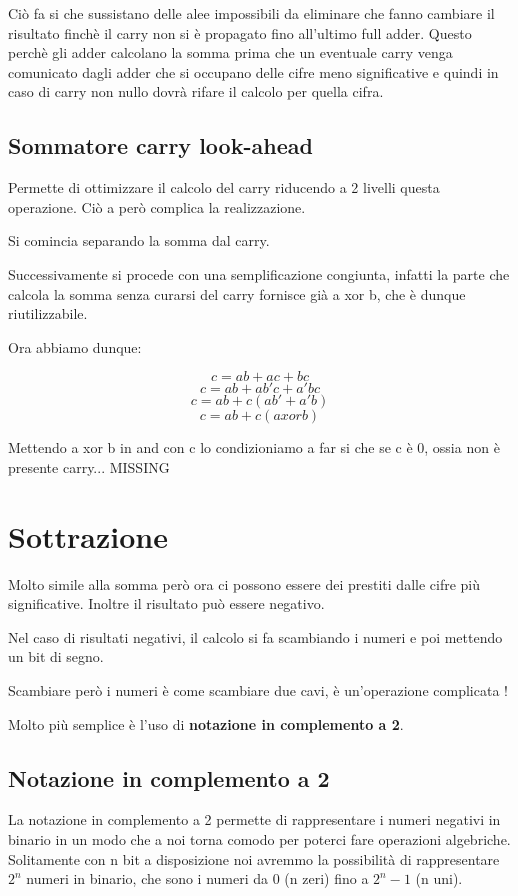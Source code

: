 \documentclass[a4paper]{book}
\begin{document}
Ciò fa si che sussistano delle alee impossibili da eliminare che fanno cambiare il risultato finchè il carry non si è propagato fino all'ultimo full adder.
Questo perchè gli adder calcolano la somma prima che un eventuale carry venga comunicato dagli adder che si occupano delle cifre meno significative e quindi in caso di carry non nullo dovrà rifare il calcolo per quella cifra.


\subsection{Sommatore carry look-ahead}

Permette di ottimizzare il calcolo del carry riducendo a 2 livelli questa operazione. Ciò a però complica la realizzazione.

Si comincia separando la somma dal carry.

Successivamente si procede con una semplificazione congiunta, infatti la parte che calcola la somma senza curarsi del carry fornisce già a xor b, che è dunque riutilizzabile.

Ora abbiamo dunque:

\[c=ab+ac+bc\]
\[c=ab+ab'c+a'bc\]
\[c=ab+c(ab'+a'b)\]
\[c=ab+c(a xor b)\]


Mettendo a xor b in and con c lo condizioniamo a far si che se c è 0, ossia non è presente carry... MISSING

\section{Sottrazione}

Molto simile alla somma però ora ci possono essere dei prestiti dalle cifre più significative.
Inoltre il risultato può essere negativo.


Nel caso di risultati negativi, il calcolo si fa scambiando i numeri e poi mettendo un bit di segno.

Scambiare però i numeri è come scambiare due cavi, è un'operazione complicata !

Molto più semplice è l'uso di \textbf{notazione in complemento a 2}. 

\subsection{Notazione in complemento a 2}

La notazione in complemento a 2 permette di rappresentare i numeri negativi in binario in un modo che a noi torna comodo per poterci fare operazioni algebriche.\\
Solitamente con n bit a disposizione noi avremmo la possibilità di rappresentare \(2^n\) numeri in binario, che sono i numeri da 0 (n zeri) fino a \(2^n-1\) (n uni).
\end{document}
